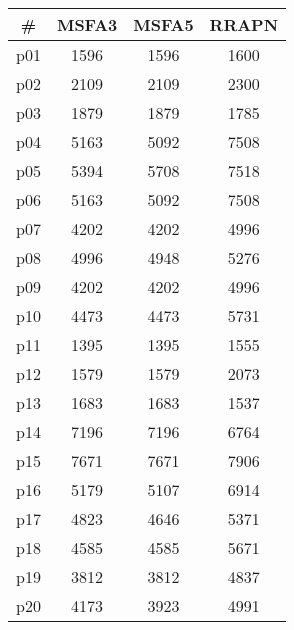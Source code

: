 \begin{tabular}{c||c|c|c}
\textbf{\#} & \textbf{MSFA3} & \textbf{MSFA5} & \textbf{RRAPN}\\
\hline
\hline
p01 & 1596 & 1596 & 1600\\
p02 & 2109 & 2109 & 2300\\
p03 & 1879 & 1879 & 1785\\
p04 & 5163 & 5092 & 7508\\
p05 & 5394 & 5708 & 7518\\
p06 & 5163 & 5092 & 7508\\
p07 & 4202 & 4202 & 4996\\
p08 & 4996 & 4948 & 5276\\
p09 & 4202 & 4202 & 4996\\
p10 & 4473 & 4473 & 5731\\
p11 & 1395 & 1395 & 1555\\
p12 & 1579 & 1579 & 2073\\
p13 & 1683 & 1683 & 1537\\
p14 & 7196 & 7196 & 6764\\
p15 & 7671 & 7671 & 7906\\
p16 & 5179 & 5107 & 6914\\
p17 & 4823 & 4646 & 5371\\
p18 & 4585 & 4585 & 5671\\
p19 & 3812 & 3812 & 4837\\
p20 & 4173 & 3923 & 4991\\
\end{tabular}

